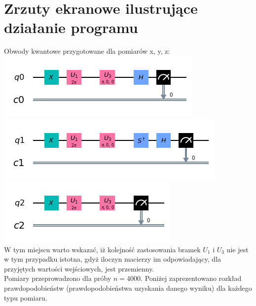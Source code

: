 \documentclass{article}
\begin{document}
\section{Zrzuty ekranowe ilustrujące działanie programu}
Obwody kwantowe przygotowane dla pomiarów x, y, z:\\
\includegraphics[]{pomiarx.png}\\
\includegraphics[]{pomiary.png}\\
\includegraphics[]{pomiarz.png}\\
W tym miejscu warto wskazać, iż kolejność zastosowania bramek $U_1$ i $U_3$ nie jest w tym przypadku istotna, gdyż iloczyn macierzy im odpowiadający, dla przyjętych wartości wejściowych, jest przemienny.\\
Pomiary przeprowadzono dla próby $n=4000$. Poniżej zaprezentowano rozkład prawdopodobieństw (prawdopodobieństwa uzyskania danego wyniku) dla każdego typu pomiaru.
\begin{center}
\end{center}
\end{document}
